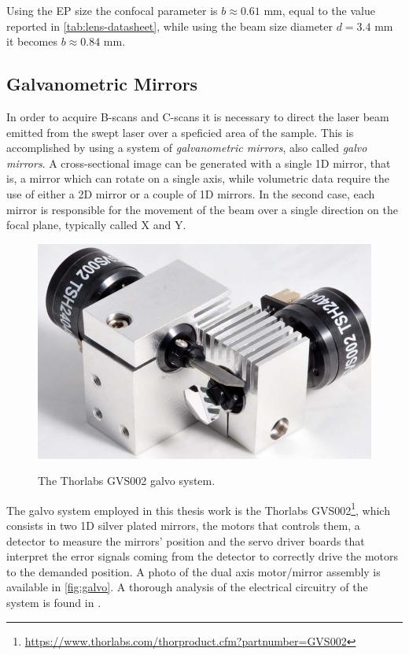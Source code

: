  
 Using the EP size the confocal parameter is $b \approx 0.61$ mm, equal to the value reported in \autoref{tab:lens-datasheet}, while using the beam size diameter $d = 3.4$ mm it becomes $b \approx 0.84$ mm. 
 
 

\subsection{Galvanometric Mirrors}

In order to acquire B-scans and C-scans it is necessary to direct the laser beam emitted from the swept laser over a speficied area of the sample. This is accomplished by using a system of \emph{galvanometric mirrors}, also called \emph{galvo mirrors}. A cross-sectional image can be generated with a single 1D mirror, that is, a mirror which can rotate on a single axis, while volumetric data require the use of either a 2D mirror or a couple of 1D mirrors. In the second case, each mirror is responsible for the movement of the beam over a single direction on the focal plane, typically called X and Y. 

\begin{figure}[bth]
	\myfloatalign
	{\includegraphics[width=0.6\linewidth]{gfx/ch3/galvo}}
	\caption{The Thorlabs GVS002 galvo system.}\label{fig:galvo}
\end{figure}

The galvo system employed in this thesis work is the Thorlabs GVS002\footnote{\url{https://www.thorlabs.com/thorproduct.cfm?partnumber=GVS002}}, which consists in two 1D silver plated mirrors, the motors that controls them, a detector to measure the mirrors' position  and the servo driver boards that interpret the error signals coming from the detector to correctly drive the motors to the demanded position. A photo of the dual axis motor/mirror assembly is available in \autoref{fig:galvo}. A thorough analysis of the electrical circuitry of the system is found in \cite{Calabrese2017}. 

